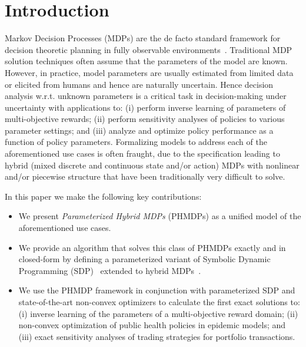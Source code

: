\section{Introduction}
\label{sec:introduction}

Markov Decision Processes (MDPs)
are the de facto standard framework for decision theoretic planning in fully observable environments~\cite{Boutilier_JAIR_1999}. 
Traditional MDP solution techniques often assume that the parameters of the model are known. 
However, in practice, model parameters are usually estimated from limited data or elicited from humans and hence are naturally uncertain.  Hence decision analysis w.r.t. unknown parameters is a critical task in decision-making under uncertainty with applications to: (i) perform inverse learning of parameters of multi-objective rewards; (ii) perform sensitivity analyses of policies to various parameter settings; and (iii) analyze and optimize policy performance as a function of policy parameters. Formalizing models to address each of the aforementioned use cases is often fraught, due to the specification leading to hybrid (mixed discrete and continuous state and/or action) MDPs with nonlinear and/or piecewise structure that have been traditionally very difficult to solve.

In this paper we make the following key contributions:
\begin{itemize}
\item We present {\it Parameterized Hybrid MDPs} (PHMDPs) as a unified model of the aforementioned use cases.
\item We provide an algorithm that solves this class of PHMDPs exactly and in closed-form by defining a parameterized variant of Symbolic Dynamic Programming (SDP)~\cite{Boutilier_IJCAI_2001} extended to hybrid MDPs~\cite{Sanner_UAI_2011}. 
\item We use the PHMDP framework in conjunction with parameterized SDP and state-of-the-art non-convex optimizers to calculate the first exact solutions to: (i) inverse learning of the parameters of a multi-objective reward domain; (ii) non-convex optimization of public health policies in epidemic models; and (iii) exact sensitivity analyses of trading strategies for portfolio transactions. 
\end{itemize}

